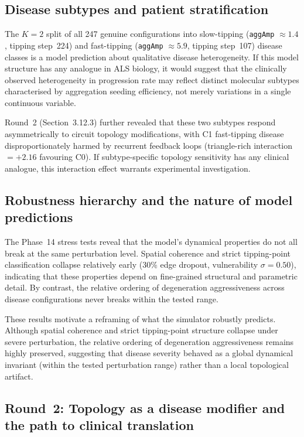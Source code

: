 \documentclass[12pt,a4paper]{article}
\begin{document}
\subsection{Disease subtypes and patient stratification}

The $K = 2$ split of all 247 genuine configurations into slow-tipping (\texttt{aggAmp}
$\approx 1.4$, tipping step~224) and fast-tipping (\texttt{aggAmp} $\approx 5.9$, tipping
step~107) disease classes is a model prediction about qualitative disease heterogeneity. If this
model structure has any analogue in ALS biology, it would suggest that the clinically observed
heterogeneity in progression rate may reflect distinct molecular subtypes characterised by
aggregation seeding efficiency, not merely variations in a single continuous variable.

Round~2 (Section~3.12.3) further revealed that these two subtypes respond asymmetrically to
circuit topology modifications, with C1 fast-tipping disease disproportionately harmed by
recurrent feedback loops (triangle-rich interaction~$= +2.16$ favouring C0). If
subtype-specific topology sensitivity has any clinical analogue, this interaction effect
warrants experimental investigation.

\subsection{Robustness hierarchy and the nature of model predictions}

The Phase~14 stress tests reveal that the model's dynamical properties do not all break at the
same perturbation level. Spatial coherence and strict tipping-point classification collapse
relatively early (30\% edge dropout, vulnerability $\sigma = 0.50$), indicating that these
properties depend on fine-grained structural and parametric detail. By contrast, the relative
ordering of degeneration aggressiveness across disease configurations never breaks within the
tested range.

These results motivate a reframing of what the simulator robustly predicts. Although spatial
coherence and strict tipping-point structure collapse under severe perturbation, the relative
ordering of degeneration aggressiveness remains highly preserved, suggesting that disease
severity behaved as a global dynamical invariant (within the tested perturbation range) rather
than a local topological artifact.

\subsection{Round~2: Topology as a disease modifier and the path to clinical translation}
\end{document}
